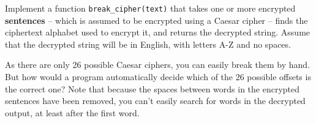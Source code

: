 \documentclass{article}
\begin{document}
Implement a function \texttt{break\_cipher(text)} that takes one or more encrypted \textbf{sentences}
-- which is assumed to be encrypted using a Caesar cipher -- finds the
ciphertext alphabet used to encrypt it, and returns the decrypted
string. Assume that the decrypted string will be in English, with
letters A-Z and no spaces.  

As there are only 26 possible Caesar ciphers, you can easily break
them by hand.  But how would a program automatically decide which of
the 26 possible offsets is the correct one?  Note that because the
spaces between words in the encrypted sentences have been removed, you
can't easily search for words in the decrypted output, at least after
the first word.
\end{document}
